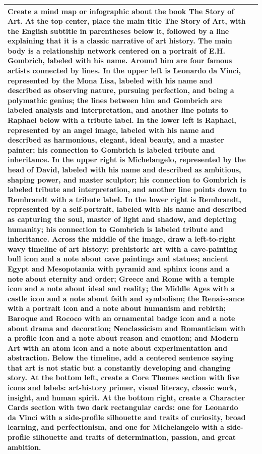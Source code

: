 \documentclass{article}
\begin{document}
\begin{table}[t]
{\begin{tabular}{p{}p{}}
Create a mind map or infographic about the book The Story of Art. At the top center, place the main title The Story of Art, with the English subtitle in parentheses below it, followed by a line explaining that it is a classic narrative of art history. The main body is a relationship network centered on a portrait of E.H. Gombrich, labeled with his name. Around him are four famous artists connected by lines. In the upper left is Leonardo da Vinci, represented by the Mona Lisa, labeled with his name and described as observing nature, pursuing perfection, and being a polymathic genius; the lines between him and Gombrich are labeled analysis and interpretation, and another line points to Raphael below with a tribute label. In the lower left is Raphael, represented by an angel image, labeled with his name and described as harmonious, elegant, ideal beauty, and a master painter; his connection to Gombrich is labeled tribute and inheritance. In the upper right is Michelangelo, represented by the head of David, labeled with his name and described as ambitious, shaping power, and master sculptor; his connection to Gombrich is labeled tribute and interpretation, and another line points down to Rembrandt with a tribute label. In the lower right is Rembrandt, represented by a self-portrait, labeled with his name and described as capturing the soul, master of light and shadow, and depicting humanity; his connection to Gombrich is labeled tribute and inheritance. Across the middle of the image, draw a left-to-right wavy timeline of art history: prehistoric art with a cave-painting bull icon and a note about cave paintings and statues; ancient Egypt and Mesopotamia with pyramid and sphinx icons and a note about eternity and order; Greece and Rome with a temple icon and a note about ideal and reality; the Middle Ages with a castle icon and a note about faith and symbolism; the Renaissance with a portrait icon and a note about humanism and rebirth; Baroque and Rococo with an ornamental badge icon and a note about drama and decoration; Neoclassicism and Romanticism with a profile icon and a note about reason and emotion; and Modern Art with an atom icon and a note about experimentation and abstraction. Below the timeline, add a centered sentence saying that art is not static but a constantly developing and changing story. At the bottom left, create a Core Themes section with five icons and labels: art-history primer, visual literacy, classic work, insight, and human spirit. At the bottom right, create a Character Cards section with two dark rectangular cards: one for Leonardo da Vinci with a side-profile silhouette and traits of curiosity, broad learning, and perfectionism, and one for Michelangelo with a side-profile silhouette and traits of determination, passion, and great ambition. \\
\bottomrule
\end{tabular}
}
\end{table}
\end{document}
